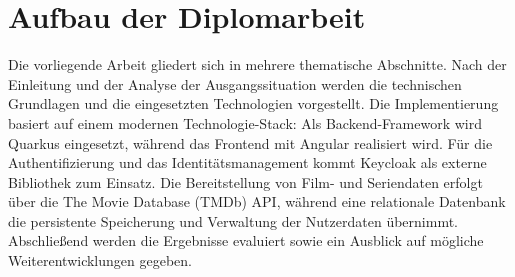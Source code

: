 \section{Aufbau der Diplomarbeit}
Die vorliegende Arbeit gliedert sich in mehrere thematische Abschnitte. Nach der Einleitung und der Analyse der Ausgangssituation werden die technischen Grundlagen und die eingesetzten Technologien vorgestellt.
Die Implementierung basiert auf einem modernen Technologie-Stack: Als Backend-Framework wird Quarkus eingesetzt, während das Frontend mit Angular realisiert wird. Für die Authentifizierung und das Identitätsmanagement kommt Keycloak als externe Bibliothek zum Einsatz. Die Bereitstellung von Film- und Seriendaten erfolgt über die The Movie Database (TMDb) API, während eine relationale Datenbank die persistente Speicherung und Verwaltung der Nutzerdaten übernimmt.
Abschließend werden die Ergebnisse evaluiert sowie ein Ausblick auf mögliche Weiterentwicklungen gegeben.